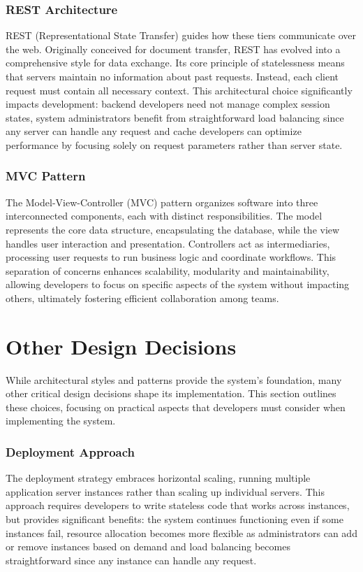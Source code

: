 \subsubsection{REST Architecture}
REST (Representational State Transfer) guides how these tiers communicate over the web.
Originally conceived for document transfer, REST has evolved into a comprehensive style for data exchange.
Its core principle of statelessness means that servers maintain no information about past requests.
Instead, each client request must contain all necessary context.
This architectural choice significantly impacts development: backend developers need not manage complex session states, system administrators benefit from straightforward load balancing since any server can handle any request and cache developers can optimize performance by focusing solely on request parameters rather than server state.

\subsubsection{MVC Pattern}
The Model-View-Controller (MVC) pattern organizes software into three interconnected components, each with distinct responsibilities.
The model represents the core data structure, encapsulating the database, while the view handles user interaction and presentation.
Controllers act as intermediaries, processing user requests to run business logic and coordinate workflows.
This separation of concerns enhances scalability, modularity and maintainability, allowing developers to focus on specific aspects of the system without impacting others, ultimately fostering efficient collaboration among teams.

\section{Other Design Decisions}
While architectural styles and patterns provide the system's foundation, many other critical design decisions shape its implementation.
This section outlines these choices, focusing on practical aspects that developers must consider when implementing the system.

\subsubsection{Deployment Approach}
The deployment strategy embraces horizontal scaling, running multiple application server instances rather than scaling up individual servers.
This approach requires developers to write stateless code that works across instances, but provides significant benefits: the system continues functioning even if some instances fail, resource allocation becomes more flexible as administrators can add or remove instances based on demand and load balancing becomes straightforward since any instance can handle any request.

